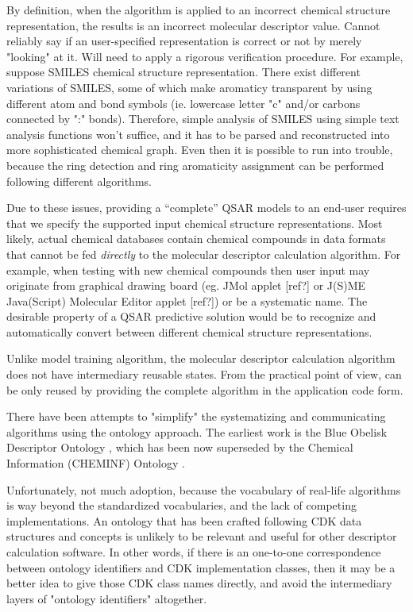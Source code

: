 \documentclass[12pt,letterpaper]{article}
\begin{document}
By definition, when the algorithm
is applied to an incorrect chemical structure representation, the
results is an incorrect molecular descriptor value. Cannot reliably
say if an user-specified representation is correct or not by merely
"looking" at it. Will need to apply a rigorous verification
procedure. For example, suppose SMILES chemical structure
representation.  There exist different variations of SMILES, some of
which make aromaticy transparent by using different atom and bond
symbols (ie. lowercase letter "c" and/or carbons connected by ":"
bonds). Therefore, simple analysis of SMILES using simple text
analysis functions won't suffice, and it has to be parsed and
reconstructed into more sophisticated chemical graph. Even then it is
possible to run into trouble, because the ring detection and ring
aromaticity assignment can be performed following different
algorithms.

Due to these issues,
providing a ``complete'' QSAR models to an end-user requires that we
specify the supported input chemical structure representations. Most
likely, actual chemical databases contain chemical compounds in data
formats that cannot be fed \emph{directly} to the molecular descriptor
calculation algorithm. For example, when testing with new chemical
compounds then user input may originate from graphical drawing board
(eg. JMol applet [ref?] or J(S)ME Java(Script) Molecular Editor applet
[ref?]) or be a systematic name. The desirable property of a QSAR
predictive solution would be to recognize and automatically convert
between different chemical structure representations.

Unlike model training algorithm, the molecular descriptor calculation
algorithm does not have intermediary reusable states. From the practical
point of view, can be only reused by providing the complete algorithm in 
the application code form.

There have been attempts to "simplify" the systematizing and
communicating algorithms using the ontology approach. The earliest
work is the Blue Obelisk Descriptor Ontology \cite{Guha:2006ac}, which
has been now superseded by the Chemical Information (CHEMINF) Ontology
\cite{Hastings:2011rf}.

Unfortunately, not much adoption, because the vocabulary of
real-life algorithms is way beyond the standardized vocabularies, and
the lack of competing implementations. An ontology that has been
crafted following CDK data structures and concepts is unlikely to be
relevant and useful for other descriptor calculation software. In
other words, if there is an one-to-one correspondence between ontology
identifiers and CDK implementation classes, then it may be a better
idea to give those CDK class names directly, and avoid the
intermediary layers of "ontology identifiers" altogether.
\end{document}
